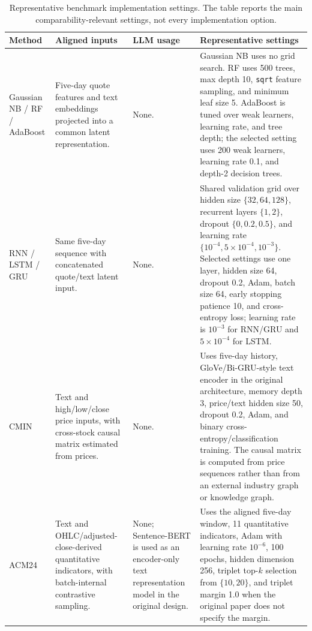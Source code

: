\documentclass[a4paper,fleqn,doubleblind]{cas-sc}
\begin{document}
\begin{table}[b]
\centering
\scriptsize
\renewcommand{\arraystretch}{0.95}
\caption{Representative benchmark implementation settings. The table reports the main comparability-relevant settings, not every implementation option.}
\begin{tabularx}{\textwidth}{>{\raggedright\arraybackslash}p{2.0cm}>{\raggedright\arraybackslash}p{2.55cm}>{\raggedright\arraybackslash}p{2.55cm}>{\raggedright\arraybackslash}X}
\toprule
\textbf{Method} & \textbf{Aligned inputs} & \textbf{LLM usage} & \textbf{Representative settings} \\
\midrule
Gaussian NB / RF / AdaBoost & Five-day quote features and text embeddings projected into a common latent representation. & None. & Gaussian NB uses no grid search. RF uses 500 trees, max depth 10, \texttt{sqrt} feature sampling, and minimum leaf size 5. AdaBoost is tuned over weak learners, learning rate, and tree depth; the selected setting uses 200 weak learners, learning rate 0.1, and depth-2 decision trees. \\
\midrule
RNN / LSTM / GRU & Same five-day sequence with concatenated quote/text latent input. & None. & Shared validation grid over hidden size $\{32,64,128\}$, recurrent layers $\{1,2\}$, dropout $\{0,0.2,0.5\}$, and learning rate $\{10^{-4},5{\times}10^{-4},10^{-3}\}$. Selected settings use one layer, hidden size 64, dropout 0.2, Adam, batch size 64, early stopping patience 10, and cross-entropy loss; learning rate is $10^{-3}$ for RNN/GRU and $5{\times}10^{-4}$ for LSTM. \\
\midrule
CMIN & Text and high/low/close price inputs, with cross-stock causal matrix estimated from prices. & None. & Uses five-day history, GloVe/Bi-GRU-style text encoder in the original architecture, memory depth 3, price/text hidden size 50, dropout 0.2, Adam, and binary cross-entropy/classification training. The causal matrix is computed from price sequences rather than from an external industry graph or knowledge graph. \\
\midrule
ACM24 & Text and OHLC/adjusted-close-derived quantitative indicators, with batch-internal contrastive sampling. & None; Sentence-BERT is used as an encoder-only text representation model in the original design. & Uses the aligned five-day window, 11 quantitative indicators, Adam with learning rate $10^{-6}$, 100 epochs, hidden dimension 256, triplet top-$k$ selection from $\{10,20\}$, and triplet margin 1.0 when the original paper does not specify the margin. \\

\end{tabularx}
\end{table}
\end{document}
